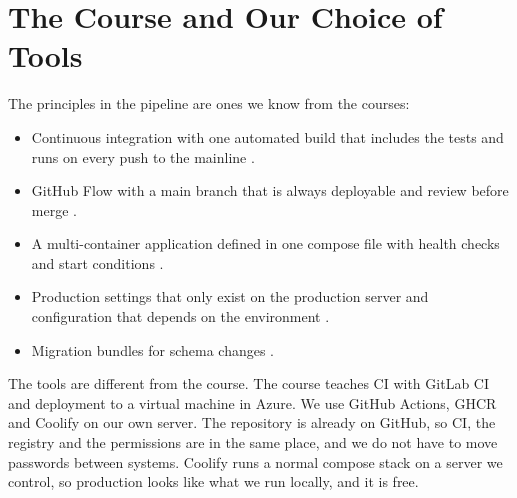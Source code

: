 \documentclass[a4paper,11pt]{article}
\begin{document}
\section{The Course and Our Choice of Tools}
The principles in the pipeline are ones we know from the courses:
\begin{itemize}
    \item Continuous integration with one automated build that includes the tests and runs on every push to the mainline \cite{fowler-continuous-integration}.
    \item GitHub Flow with a main branch that is always deployable \cite{chacon-github-flow-2011} and review before merge \cite{github-docs-github-flow}.
    \item A multi-container application defined in one compose file \cite{docker-compose-overview} with health checks and start conditions \cite{docker-compose-startup-order}.
    \item Production settings that only exist on the production server \cite[sec.~12.1.4]{desanctis-web-apis-aspnet-core} and configuration that depends on the environment \cite[sec.~2.4.2]{desanctis-web-apis-aspnet-core}.
    \item Migration bundles for schema changes \cite[sec.~12.4.4]{desanctis-web-apis-aspnet-core}.
\end{itemize}

The tools are different from the course. The course teaches CI with GitLab CI and deployment to a virtual machine in Azure. We use GitHub Actions, GHCR and Coolify on our own server. The repository is already on GitHub, so CI, the registry and the permissions are in the same place, and we do not have to move passwords between systems. Coolify runs a normal compose stack on a server we control, so production looks like what we run locally, and it is free.

\printbibliography
\end{document}
